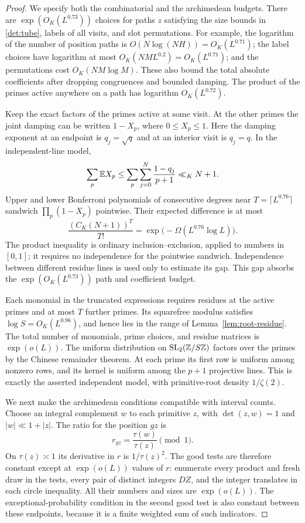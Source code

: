 \begin{proof}
We specify both the combinatorial and the archimedean budgets.
There are $\exp(O_K(L^{0.73}))$ choices for paths $z$ satisfying
the size bounds in \eqref{det:tube}, labels of all visits, and
slot permutations.  For example, the logarithm of the number
of position paths is $O(N\log(NH))=O_K(L^{0.71})$;
the label choices have logarithm at most
$O_K(NML^{0.2})=O_K(L^{0.71})$; and the permutations cost
$O_K(NM\log M)$.  These also bound the total absolute
coefficients after dropping congruences and bounded damping.
The product of the primes active anywhere on a path has
logarithm $O_K(L^{0.72})$.

Keep the exact factors of the primes active at some visit.
At the other primes the joint damping can be written $1-X_p$,
where $0\leq X_p\leq1$.  Here the damping exponent at an
endpoint is $q_j=\sqrt q$ and at an interior visit is $q_j=q$.
In the independent-line model,
\[
 \sum_p\mathbb E X_p
 \leq\sum_p\sum_{j=0}^N\frac{1-q_j}{p+1}
 \ll_K N+1.
\]
Upper and lower Bonferroni polynomials of consecutive degrees
near $T=\lceil L^{0.76}\rceil$ sandwich
$\prod_p(1-X_p)$ pointwise.  Their expected difference is at
most
\[
 \frac{(C_K(N+1))^T}{T!}
       =\exp\bigl(-\Omega(L^{0.76}\log L)\bigr).
\]
The product inequality is ordinary inclusion--exclusion, applied
to numbers in $[0,1]$; it requires no independence for the
pointwise sandwich.  Independence between different residue
lines is used only to estimate its gap.  This gap absorbs the
$\exp(O_K(L^{0.73}))$ path and coefficient budget.

Each monomial in the truncated expressions requires residues at
the active primes and at most $T$ further primes.  Its squarefree
modulus satisfies
$\log S=O_K(L^{0.96})$, and hence lies in the range of
Lemma~\ref{lem:root-residue}.  The total number of monomials,
prime choices, and residue matrices is $\exp(o(L))$.
The uniform distribution on $\mathrm{SL}_2(\mathbb Z/S\mathbb Z)$ factors
over the primes by the Chinese remainder theorem.  At each
prime its first row is uniform among nonzero rows, and its
kernel is uniform among the $p+1$ projective lines.  This is
exactly the asserted independent model, with primitive-root
density $1/\zeta(2)$.

We next make the archimedean conditions compatible with interval
counts.  Choose an integral complement $w$ to each primitive
$z$, with $\det(z,w)=1$ and $|w|\ll1+|z|$.  The ratio for the
position $gz$ is
\begin{equation}\label{det:transported-ratio}
 r_{gz}=\frac{\tau(w)}{\tau(z)}\pmod1.
\end{equation}
On $\tau(z)\asymp1$ its derivative in $r$ is
$1/\tau(z)^2$.  The good tests are therefore constant except
at $\exp(o(L))$ values of $r$: enumerate every product and
fresh draw in the tests, every pair of distinct integers $DZ$,
and the integer translates in each circle inequality.
All their numbers and sizes are $\exp(o(L))$.
The exceptional-probability condition in the second good test
is also constant between these endpoints, because it is a
finite weighted sum of such indicators.


\end{proof}
